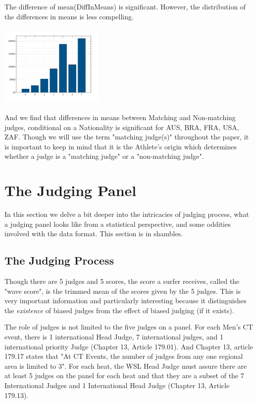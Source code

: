 \documentclass{article}
\theoremstyle{definition}
\begin{document}
The difference of mean(DiffInMeans) is significant. However, the distribution of the differences in means is less compelling. 

\includegraphics[width=5cm, height=4cm]{./src/visuals/marginal_RND.png}

And we find that differences in means between Matching and Non-matching judges, conditional on a Nationality is significant for AUS, BRA, FRA, USA, ZAF. Though we will use the term "matching judge(s)" throughout the paper, it is important to keep in mind that it is the Athlete's origin which determines whether a judge is a "matching judge" or a "non-matching judge".

\section{The Judging Panel}
In this section we delve a bit deeper into the intricacies of judging process, what a judging panel looks like from a statistical perspective, and some oddities involved with the data format. This section is in shambles.
\subsection{The Judging Process}
Though there are 5 judges and 5 scores, the score a surfer receives, called the "wave score", is the trimmed mean of the scores given by the 5 judges. This is very important information and particularly interesting because it distinguishes the \textit{existence} of biased judges from the effect of biased judging (if it exists).

The role of judges is not limited to the five judges on a panel. For each Men's CT event, there is 1 international Head Judge, 7 international judges, and 1 international priority Judge (Chapter 13, Article 179.01). And Chapter 13, article 179.17 states that "At CT Events, the number of judges from any one regional area is limited to 3". For each heat, the WSL Head Judge must assure there are at least 5 judges on the panel for each heat and that they are a subset of the 7 International Judges and 1 International Head Judge (Chapter 13, Article 179.13).
\end{document}
